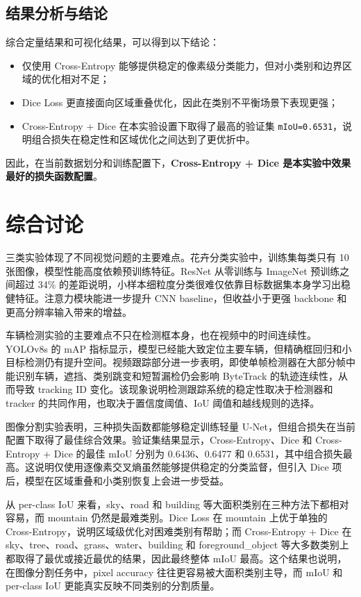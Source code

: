 \documentclass[UTF8,a4paper,11pt]{ctexart}
\newcommand{\code}[1]{\texttt{#1}}
\begin{document}
\subsection{结果分析与结论}

综合定量结果和可视化结果，可以得到以下结论：
\begin{itemize}
    \item 仅使用 Cross-Entropy 能够提供稳定的像素级分类能力，但对小类别和边界区域的优化相对不足；
    \item Dice Loss 更直接面向区域重叠优化，因此在类别不平衡场景下表现更强；
    \item Cross-Entropy + Dice 在本实验设置下取得了最高的验证集 \code{mIoU=0.6531}，说明组合损失在稳定性和区域优化之间达到了更优折中。
\end{itemize}

因此，在当前数据划分和训练配置下，\textbf{Cross-Entropy + Dice 是本实验中效果最好的损失函数配置}。
\section{综合讨论}

三类实验体现了不同视觉问题的主要难点。花卉分类实验中，训练集每类只有 10 张图像，模型性能高度依赖预训练特征。ResNet 从零训练与 ImageNet 预训练之间超过 34\% 的差距说明，小样本细粒度分类很难仅依靠目标数据集本身学习出稳健特征。注意力模块能进一步提升 CNN baseline，但收益小于更强 backbone 和更高分辨率输入带来的增益。

车辆检测实验的主要难点不只在检测框本身，也在视频中的时间连续性。YOLOv8s 的 mAP 指标显示，模型已经能大致定位主要车辆，但精确框回归和小目标检测仍有提升空间。视频跟踪部分进一步表明，即使单帧检测器在大部分帧中能识别车辆，遮挡、类别跳变和短暂漏检仍会影响 ByteTrack 的轨迹连续性，从而导致 tracking ID 变化。该现象说明检测跟踪系统的稳定性取决于检测器和 tracker 的共同作用，也取决于置信度阈值、IoU 阈值和越线规则的选择。

图像分割实验表明，三种损失函数都能够稳定训练轻量 U-Net，但组合损失在当前配置下取得了最佳综合效果。验证集结果显示，Cross-Entropy、Dice 和 Cross-Entropy + Dice 的最佳 mIoU 分别为 0.6436、0.6477 和 0.6531，其中组合损失最高。这说明仅使用逐像素交叉熵虽然能够提供稳定的分类监督，但引入 Dice 项后，模型在区域重叠和小类别恢复上会进一步受益。

从 per-class IoU 来看，sky、road 和 building 等大面积类别在三种方法下都相对容易，而 mountain 仍然是最难类别。Dice Loss 在 mountain 上优于单独的 Cross-Entropy，说明区域级优化对困难类别有帮助；而 Cross-Entropy + Dice 在 sky、tree、road、grass、water、building 和 foreground\_object 等大多数类别上都取得了最优或接近最优的结果，因此最终整体 mIoU 最高。这个结果也说明，在图像分割任务中，pixel accuracy 往往更容易被大面积类别主导，而 mIoU 和 per-class IoU 更能真实反映不同类别的分割质量。
\end{document}
